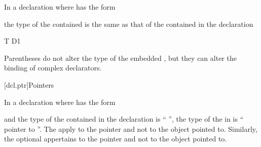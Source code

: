\pnum
In a declaration
where
has the form
\begin{ncsimplebnf}
\terminal{(}  \terminal{)}
\end{ncsimplebnf}
the type of the contained
is the same as that of the contained
in the declaration
\begin{codeblock}
T D1
\end{codeblock}
%
Parentheses do not alter the type of the embedded
,
but they can alter the binding of complex declarators.

[dcl.ptr]{Pointers}%
%

\pnum
In a declaration
where
has the form
\begin{ncsimplebnf}
\terminal{*}   
\end{ncsimplebnf}
and the type of the contained  in the declaration
is ``
'',
the type of the  in
is ``  pointer to
''.
%
%
The
apply to the pointer and not to the object pointed to.
Similarly, the optional  appertains to the pointer and not to the object pointed to.

